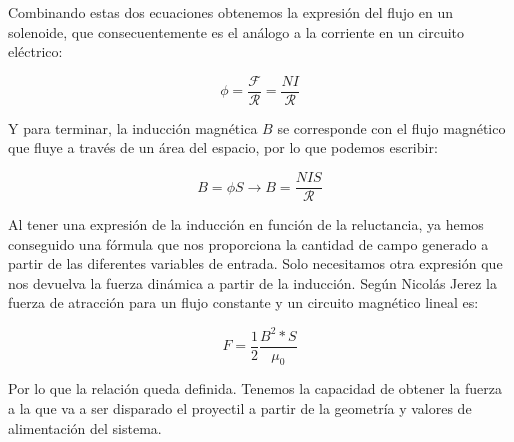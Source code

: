 Combinando estas dos ecuaciones obtenemos la expresión del flujo en un solenoide, que consecuentemente es el análogo a la corriente en un circuito eléctrico:

\begin{center}
    \[\phi=\frac{\mathcal{F}}{\mathcal{R}}=\frac{NI}{\mathcal{R}}\]
\end{center}

Y para terminar, la inducción magnética \(B\) se corresponde con el flujo magnético que fluye a través de un área del espacio, por lo que podemos escribir:

\begin{center}
    \[B=\phi S\to B=\frac{NIS}{\mathcal{R}}\]
\end{center}

Al tener una expresión de la inducción en función de la reluctancia, ya hemos conseguido una fórmula que nos proporciona la cantidad de campo generado a partir de las diferentes variables de entrada. Solo necesitamos otra expresión que nos devuelva la fuerza dinámica a partir de la inducción. Según Nicolás Jerez \citep{jerez2016resueltos} la fuerza de atracción para un flujo constante y un circuito magnético lineal es:
\begin{center}
\[F=\frac{1}{2}\frac{B^2*S}{\mu_0}\]
\end{center}

Por lo que la relación queda definida. Tenemos la capacidad de obtener la fuerza a la que va a ser disparado el proyectil a partir de la geometría y valores de alimentación del sistema.